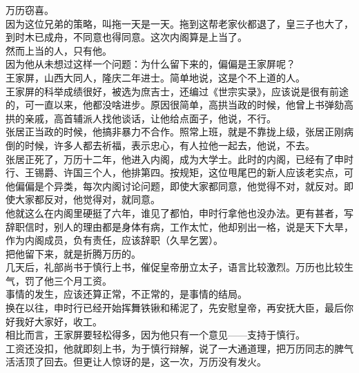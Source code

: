 \begin{multicols}{\theparacolNo}
万历窃喜。\\

因为这位兄弟的策略，叫拖一天是一天。拖到这帮老家伙都退了，皇三子也大了，到时木已成舟，不同意也得同意。这次内阁算是上当了。\\

然而上当的人，只有他。\\

因为他从未想过这样一个问题：为什么留下来的，偏偏是王家屏呢？\\

王家屏，山西大同人，隆庆二年进士。简单地说，这是个不上道的人。\\

王家屏的科举成绩很好，被选为庶吉士，还编过《世宗实录》，应该说是很有前途的，可一直以来，他都没啥进步。原因很简单，高拱当政的时候，他曾上书弹劾高拱的亲戚，高首辅派人找他谈话，让他给点面子，他说，不行。\\

张居正当政的时候，他搞非暴力不合作。照常上班，就是不靠拢上级，张居正刚病倒的时候，许多人都去祈福，表示忠心，有人拉他一起去，他说，不去。\\

张居正死了，万历十二年，他进入内阁，成为大学士。此时的内阁，已经有了申时行、王锡爵、许国三个人，他排第四。按规矩，这位甩尾巴的新人应该老实点，可他偏偏是个异类，每次内阁讨论问题，即使大家都同意，他觉得不对，就反对。即使大家都反对，他觉得对，就同意。\\

他就这么在内阁里硬挺了六年，谁见了都怕，申时行拿他也没办法。更有甚者，写辞职信时，别人的理由都是身体有病，工作太忙，他却别出一格，说是天下大旱，作为内阁成员，负有责任，应该辞职（久旱乞罢）。\\

把他留下来，就是折腾万历的。\\

几天后，礼部尚书于慎行上书，催促皇帝册立太子，语言比较激烈。万历也比较生气，罚了他三个月工资。\\

事情的发生，应该还算正常，不正常的，是事情的结局。\\

换在以往，申时行已经开始挥舞铁锹和稀泥了，先安慰皇帝，再安抚大臣，最后你好我好大家好，收工。\\

相比而言，王家屏要轻松得多，因为他只有一个意见——支持于慎行。\\

工资还没扣，他就即刻上书，为于慎行辩解，说了一大通道理，把万历同志的脾气活活顶了回去。但更让人惊讶的是，这一次，万历没有发火。\\


\end{multicols}
